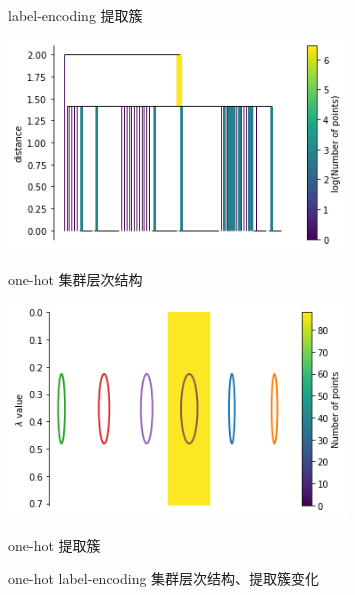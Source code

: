 \begin{figure}[htb]
\begin{minipage}[htb]{0.4\linewidth}
        \caption{label-encoding 提取簇}
    \end{minipage}
    \begin{minipage}[htb]{0.4\linewidth}
        \includegraphics[width=0.8\textwidth]{images/HDBSCAN-single-linkage-tree-one-hot.png}
        \caption{one-hot 集群层次结构}
    \end{minipage}
    \begin{minipage}[htb]{0.4\linewidth}
        \includegraphics[width=0.8\textwidth]{images/HDBSCAN-condensed-tree-one-hot.png}
        \caption{one-hot 提取簇}
    \end{minipage}
    \caption{one-hot label-encoding 集群层次结构、提取簇变化}\label{single-linkage-tree-condensed-tree} %
\end{figure}

